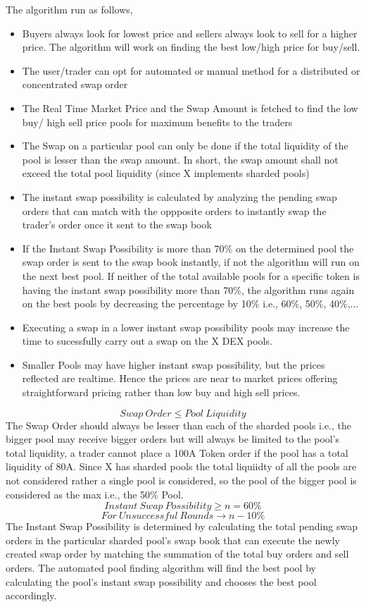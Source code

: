 \documentclass[letterpaper,11pt]{article}
\begin{document}
The algorithm run as follows,
\begin{itemize}[wide, labelwidth=!, labelindent=0pt]
\item Buyers always look for lowest price and sellers always look to sell for a higher price. The algorithm will work on finding the best low/high price for buy/sell.
\item The user/trader can opt for automated or manual method for a distributed or concentrated swap order
\item The Real Time Market Price and the Swap Amount is fetched to find the low buy/ high sell price pools for maximum benefits to the traders
\item The Swap on a particular pool can only be done if the total liquidity of the pool is lesser than the swap amount. In short, the swap amount shall not exceed the total pool liquidity (since X implements sharded pools)
\item The instant swap possibility is calculated by analyzing the pending swap orders that can match with the oppposite orders to instantly swap the trader's order once it sent to the swap book
\item If the Instant Swap Possibility is more than 70\% on the determined pool the swap order is sent to the swap book instantly, if not the algorithm will run on the next best pool. If neither of the total available pools for a specific token is having the instant swap possibility more than 70\%, the algorithm runs again on the best pools by decreasing the percentage by 10\% i.e., 60\%, 50\%, 40\%,...
\item Executing a swap in a lower instant swap possibility pools may increase the time to sucessfully carry out a swap on the X DEX pools.
\item Smaller Pools may have higher instant swap possibility, but the prices reflected are realtime. Hence the prices are near to market prices offering straightforward pricing rather than low buy and high sell prices.
\end{itemize}
\[Swap\:Order \leq Pool\:Liquidity \]
The Swap Order should always be lesser than each of the sharded pools i.e., the bigger pool may receive bigger orders but will always be limited to the pool's total liquidity, a trader cannot place a 100A Token order if the pool has a total liquidity of 80A. Since X has sharded pools the total liquiidty of all the pools are not considered rather a single pool is considered, so the pool of the bigger pool is considered as the max i.e., the 50\% Pool.\\
\[Instant\:Swap\:Possibility \geq n = 60\%\]
\[For\:Unsuccessful\:Rounds \rightarrow n-10\%\]
The Instant Swap Possibility is determined by calculating the total pending swap orders in the particular sharded pool's swap book that can execute the newly created swap order by matching the summation of the total buy orders and sell orders. The automated pool finding algorithm will find the best pool by calculating the pool's instant swap possibility and chooses the best pool accordingly.\\
\end{document}
